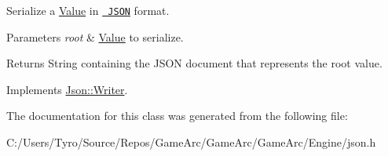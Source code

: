 Serialize a \mbox{\hyperlink{class_json_1_1_value}{Value}} in \href{http://www.json.org}{\texttt{ J\+S\+ON}} format. 


\begin{DoxyParams}{Parameters}
{\em root} & \mbox{\hyperlink{class_json_1_1_value}{Value}} to serialize. \\
\hline
\end{DoxyParams}
\begin{DoxyReturn}{Returns}
String containing the J\+S\+ON document that represents the root value. 
\end{DoxyReturn}


Implements \mbox{\hyperlink{class_json_1_1_writer}{Json\+::\+Writer}}.



The documentation for this class was generated from the following file\+:\begin{DoxyCompactItemize}
\item 
C\+:/\+Users/\+Tyro/\+Source/\+Repos/\+Game\+Arc/\+Game\+Arc/\+Game\+Arc/\+Engine/json.\+h\end{DoxyCompactItemize}
